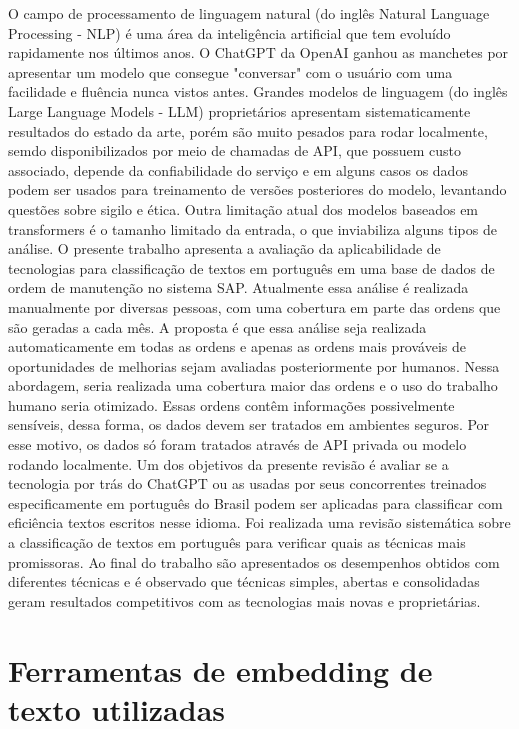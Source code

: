 \documentclass[conference]{IEEEtran}
\begin{document}
  O campo de processamento de linguagem natural (do inglês Natural Language Processing - NLP) é uma área da inteligência artificial que tem evoluído rapidamente nos últimos anos. O ChatGPT da OpenAI \cite{NIPS2017_3f5ee243} \cite{Radford2018ImprovingLU} \cite{radford_language_2019} \cite{brown2020language} ganhou as manchetes por apresentar um modelo que consegue "conversar" com o usuário com uma facilidade e fluência nunca vistos antes. Grandes modelos de linguagem (do inglês Large Language Models - LLM) proprietários apresentam sistematicamente resultados do estado da arte, porém são muito pesados para rodar localmente, semdo disponibilizados por meio de chamadas de API, que possuem custo associado, depende da confiabilidade do serviço e em alguns casos os dados podem ser usados para treinamento de versões posteriores do modelo, levantando questões sobre sigilo e ética. Outra limitação atual dos modelos baseados em transformers é o tamanho limitado da entrada, o que inviabiliza alguns tipos de análise. O presente trabalho apresenta a avaliação da aplicabilidade de tecnologias para classificação de textos em português em uma base de dados de ordem de manutenção no sistema SAP. Atualmente essa análise é realizada manualmente por diversas pessoas, com uma cobertura em parte das ordens que são geradas a cada mês. A proposta é que essa análise seja realizada automaticamente em todas as ordens e apenas as ordens mais prováveis de oportunidades de melhorias sejam avaliadas posteriormente por humanos. Nessa abordagem, seria realizada uma cobertura maior das ordens e o uso do trabalho humano seria otimizado. Essas ordens contêm informações possivelmente sensíveis, dessa forma, os dados devem ser tratados em ambientes seguros. Por esse motivo, os dados só foram tratados através de API privada ou modelo rodando localmente. Um dos objetivos da presente revisão é avaliar se a tecnologia por trás do ChatGPT ou as usadas por seus concorrentes treinados especificamente em português do Brasil \cite{souza2020bertimbau} \cite{Gomes2021} podem ser aplicadas para classificar com eficiência textos escritos nesse idioma. Foi realizada uma revisão sistemática sobre a classificação de textos em português para verificar quais as técnicas mais promissoras. Ao final do trabalho são apresentados os desempenhos obtidos com diferentes técnicas e é observado que técnicas simples, abertas e consolidadas geram resultados competitivos com as tecnologias mais novas e proprietárias.

\section{Ferramentas de embedding de texto utilizadas}
\end{document}
